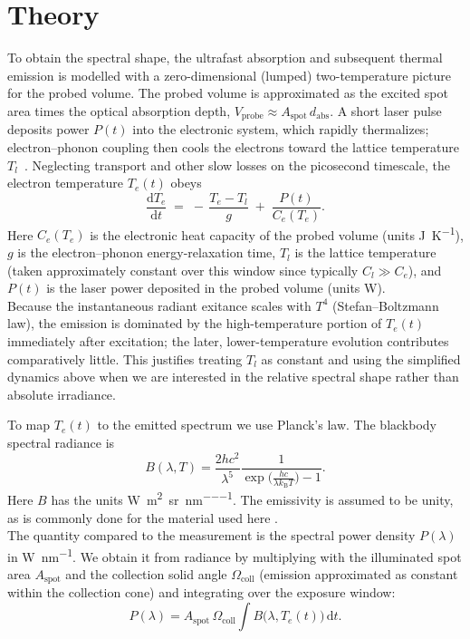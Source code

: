 \documentclass[
	parskip=half,
	a4paper,
]{scrarticle}
\begin{document}
\section{Theory}
To obtain the spectral shape, the ultrafast absorption and subsequent thermal emission is modelled with a zero-dimensional (lumped) two-temperature picture for the probed volume. The probed volume is approximated as the excited spot area times the optical absorption depth, \(V_{\text{probe}} \approx A_{\text{spot}}\,d_{\text{abs}}\). A short laser pulse deposits power \(P(t)\) into the electronic system, which rapidly thermalizes; electron–phonon coupling then cools the electrons toward the lattice temperature \(T_l\)~\cite{kampfrathStronglyCoupledOptical2005}. Neglecting transport and other slow losses on the picosecond timescale, the electron temperature \(T_e(t)\) obeys
\begin{equation}
    \frac{\mathrm d T_e}{\mathrm d t}
    \;=\;
    -\,\frac{T_e - T_l}{g}
    \;+\;
    \frac{P(t)}{C_e(T_e)}.
    \label{eq:Te}
\end{equation}
Here \(C_e(T_e)\) is the electronic heat capacity of the probed volume (units \si{J\per K}), \(g\) is the electron–phonon energy-relaxation time, \(T_l\) is the lattice temperature (taken approximately constant over this window since typically \(C_l \gg C_e\)), and \(P(t)\) is the laser power deposited in the probed volume (units \si{W}).\\
Because the instantaneous radiant exitance scales with \(T^4\) (Stefan–Boltzmann law), the emission is dominated by the high-temperature portion of \(T_e(t)\) immediately after excitation; the later, lower-temperature evolution contributes comparatively little. This justifies treating \(T_l\) as constant and using the simplified dynamics above when we are interested in the relative spectral shape rather than absolute irradiance. \cite{roobThermalRadiationUltrafast2025}

To map \(T_e(t)\) to the emitted spectrum we use Planck’s law. The blackbody spectral radiance is
\begin{equation}
    B(\lambda,T)
    = \frac{2hc^{2}}{\lambda^{5}}
      \frac{1}{\exp\bigl(\tfrac{hc}{\lambda k_{\mathrm B}T}\bigr)-1}.
    \label{eq:B}
\end{equation}
Here \(B\) has the units \si{\watt\per\metre\squared\per\steradian\per\nano\metre}. The emissivity is assumed to be unity, as is commonly done for the material used here \cite{sapritskyBlackbodyRadiometry1995}.\\
The quantity compared to the measurement is the spectral power density \(P(\lambda)\) in \si{\watt\per\nano\metre}. We obtain it from radiance by multiplying with the illuminated spot area \(A_{\text{spot}}\) and the collection solid angle \(\Omega_{\text{coll}}\) (emission approximated as constant within the collection cone) and integrating over the exposure window:
\begin{equation}
      P(\lambda) = A_{\text{spot}}\,\Omega_{\text{coll}}
      \int B\bigl(\lambda, T_e(t)\bigr)\,\mathrm dt.
      \label{eq:P}
\end{equation}
\end{document}
